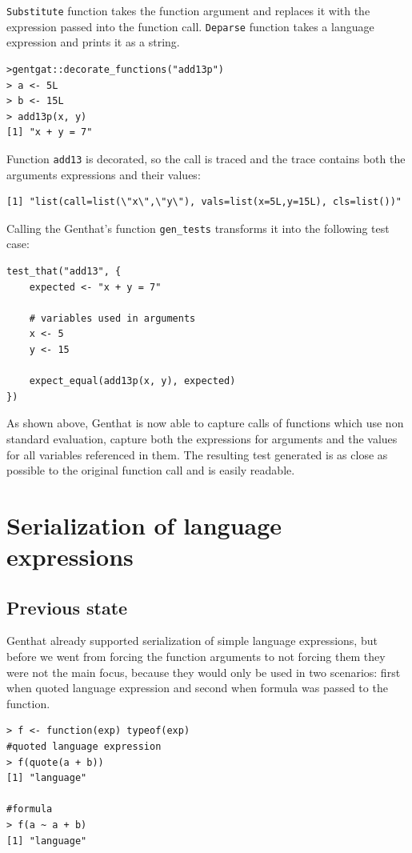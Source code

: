 \documentclass[thesis=B,english]{FITthesis}[2012/10/20]
\begin{document}
\verb|Substitute| function takes the function argument and replaces it with the expression passed into the function call. \verb|Deparse| function takes a language expression and prints it as a string.

\begin{verbatim}
>gentgat::decorate_functions("add13p")
> a <- 5L
> b <- 15L
> add13p(x, y)
[1] "x + y = 7"
\end{verbatim}

Function \verb|add13| is decorated, so the call is traced and the trace contains both the arguments expressions and their values:

\begin{verbatim}
[1] "list(call=list(\"x\",\"y\"), vals=list(x=5L,y=15L), cls=list())"
\end{verbatim}

Calling the Genthat’s function \verb|gen_tests| transforms it into the following test case:

\begin{verbatim}
test_that("add13", {
    expected <- "x + y = 7"

    # variables used in arguments
    x <- 5
    y <- 15

    expect_equal(add13p(x, y), expected)
})
\end{verbatim}

As shown above, Genthat is now able to capture calls of functions which use non standard evaluation, capture both the expressions for arguments and the values for all variables referenced in them.  The resulting test generated is as close as possible to the original function call and is easily readable. 

\chapter{Serialization of language expressions}
\section{Previous state}
Genthat already supported serialization of simple language expressions, but before we went from forcing the function arguments to not forcing them they were not the main focus, because they would only be used in two scenarios:  first when quoted language expression and second when formula was passed to the function. 

\begin{verbatim}
> f <- function(exp) typeof(exp)
#quoted language expression
> f(quote(a + b))
[1] "language"

#formula
> f(a ~ a + b)
[1] "language"
\end{verbatim}
\end{document}
